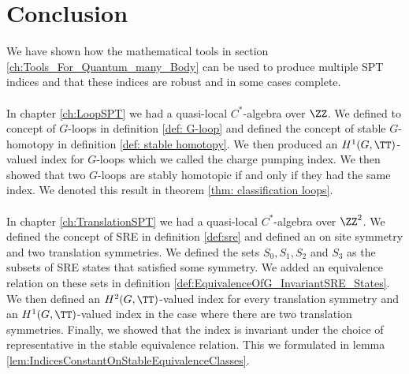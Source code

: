 \chapter{Conclusion}\label{ch:conclusion}

We have shown how the mathematical tools in section \ref{ch:Tools_For_Quantum_many_Body} can be used to produce multiple SPT indices and that these indices are robust and in some cases complete.
\\\\
In chapter \ref{ch:LoopSPT} we had a quasi-local $C^*$-algebra over $\ZZ$. We defined to concept of $G$-loops in definition \ref{def: G-loop} and defined the concept of stable $G$-homotopy in definition \ref{def: stable homotopy}. We then produced an $H^1(G,\TT)$-valued index for $G$-loops which we called the charge pumping index. We then showed that two $G$-loops are stably homotopic if and only if they had the same index. We denoted this result in theorem \ref{thm: classification loops}.
\\\\
In chapter \ref{ch:TranslationSPT} we had a quasi-local $C^*$-algebra over $\ZZ^2$. We defined the concept of SRE in definition \ref{def:sre} and defined an on site symmetry and two translation symmetries. We defined the sets $S_0,S_1,S_2$ and $S_3$ as the subsets of SRE states that satisfied some symmetry. We added an equivalence relation on these sets in definition \ref{def:EquivalenceOfG_InvariantSRE_States}. We then defined an $H^2(G,\TT)$-valued index for every translation symmetry and an $H^1(G,\TT)$-valued index in the case where there are two translation symmetries. Finally, we showed that the index is invariant under the choice of representative in the stable equivalence relation. This we formulated in lemma \ref{lem:IndicesConstantOnStableEquivalenceClasses}.
\cleardoublepage

